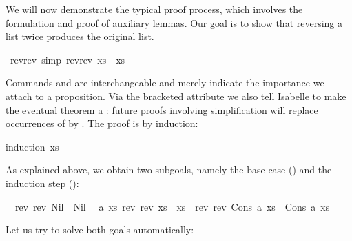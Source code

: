 \begin{isabellebody}
\begin{isamarkuptext}
We will now demonstrate the typical proof process, which involves
the formulation and proof of auxiliary lemmas.
Our goal is to show that reversing a list twice produces the original
list.%
\end{isamarkuptext}%
\isamarkuptrue%
\isamarkupfalse%
\ rev{}rev\ {}simp{}{}\ {}rev{}rev\ xs{}\ {}\ xs{}%
\isadelimproof
%
\endisadelimproof
%
\isatagproof
%
\begin{isamarkuptxt}%
Commands  and  are
interchangeable and merely indicate the importance we attach to a
proposition. Via the bracketed attribute  we also tell Isabelle
to make the eventual theorem a : future proofs
involving simplification will replace occurrences of  by
. The proof is by induction:%
\end{isamarkuptxt}%
\isamarkuptrue%
\isamarkupfalse%
{}induction\ xs{}%
\begin{isamarkuptxt}%
As explained above, we obtain two subgoals, namely the base case () and the induction step ():
\begin{isabelle}%
\ {}{}\ rev\ {}rev\ Nil{}\ {}\ Nil\isanewline
\ {}{}\ {}a\ xs{}\ rev\ {}rev\ xs{}\ {}\ xs\ {}\ rev\ {}rev\ {}Cons\ a\ xs{}{}\ {}\ Cons\ a\ xs%
\end{isabelle}
Let us try to solve both goals automatically:%
\end{isamarkuptxt}%
\isamarkuptrue%
\isamarkupfalse%

\end{isabellebody}
